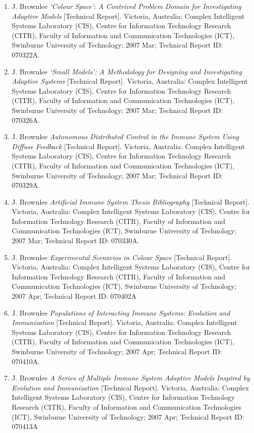 \begin{enumerate}
	\item J. Brownlee \emph{`Colour Space': A Contrived Problem Domain for Investigating Adaptive Models} [Technical Report]. Victoria, Australia: Complex Intelligent Systems Laboratory (CIS), Centre for Information Technology Research (CITR), Faculty of Information and Communication Technologies (ICT), Swinburne University of Technology; 2007 Mar; Technical Report ID: 070322A.
	\item J. Brownlee \emph{`Small Models': A Methodology for Designing and Investigating Adaptive Systems} [Technical Report]. Victoria, Australia: Complex Intelligent Systems Laboratory (CIS), Centre for Information Technology Research (CITR), Faculty of Information and Communication Technologies (ICT), Swinburne University of Technology; 2007 Mar; Technical Report ID: 070326A.
	\item J. Brownlee \emph{Autonomous Distributed Control in the Immune System Using Diffuse Feedback} [Technical Report]. Victoria, Australia: Complex Intelligent Systems Laboratory (CIS), Centre for Information Technology Research (CITR), Faculty of Information and Communication Technologies (ICT), Swinburne University of Technology; 2007 Mar; Technical Report ID: 070329A.
	\item J. Brownlee \emph{Artificial Immune System Thesis Bibliography} [Technical Report]. Victoria, Australia: Complex Intelligent Systems Laboratory (CIS), Centre for Information Technology Research (CITR), Faculty of Information and Communication Technologies (ICT), Swinburne University of Technology; 2007 Mar; Technical Report ID: 070330A.
	\item J. Brownlee \emph{Experimental Scenarios in Colour Space} [Technical Report]. Victoria, Australia: Complex Intelligent Systems Laboratory (CIS), Centre for Information Technology Research (CITR), Faculty of Information and Communication Technologies (ICT), Swinburne University of Technology; 2007 Apr; Technical Report ID: 070402A
	\item J. Brownlee \emph{Populations of Interacting Immune Systems: Evolution and Immunization} [Technical Report]. Victoria, Australia: Complex Intelligent Systems Laboratory (CIS), Centre for Information Technology Research (CITR), Faculty of Information and Communication Technologies (ICT), Swinburne University of Technology; 2007 Apr; Technical Report ID: 070410A.
	\item J. Brownlee \emph{A Series of Multiple Immune System Adaptive Models Inspired by Evolution and Immunization} [Technical Report]. Victoria, Australia: Complex Intelligent Systems Laboratory (CIS), Centre for Information Technology Research (CITR), Faculty of Information and Communication Technologies (ICT), Swinburne University of Technology; 2007 Apr; Technical Report ID: 070413A

\end{enumerate}
